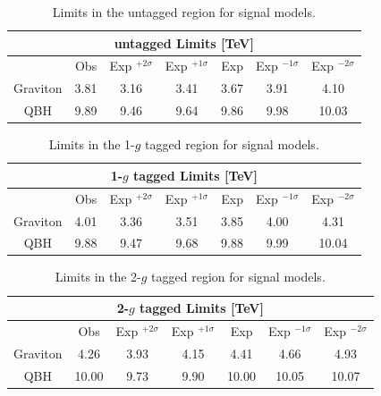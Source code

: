 \begin{table}
	\begin{center} 
		\begin{tabular}{ c c c c c c c }
			\hline
			\multicolumn{7}{c}{ untagged  Limits [TeV]}  \\ \hline
			& Obs & Exp $^{+2\sigma}$&Exp $^{+1\sigma}$ &Exp & Exp $^{-1\sigma}$&Exp $^{-2\sigma}$\\	\hline
			Graviton&3.81 &3.16&3.41  &3.67 &3.91&4.10\\\hline
			QBH&9.89 &9.46&9.64 &9.86 &9.98&10.03\\
			\hline
		\end{tabular}
		\caption{ Limits in the untagged region for signal models.}
		\label{tab:0g}
	\end{center}
\end{table}

\begin{table}
\begin{center} 
\begin{tabular}{ c c c c c c c }
	\hline
	\multicolumn{7}{c}{ 1-$g$ tagged  Limits [TeV]}  \\ \hline
	 & Obs & Exp $^{+2\sigma}$&Exp $^{+1\sigma}$ &Exp & Exp $^{-1\sigma}$&Exp $^{-2\sigma}$\\	\hline
	Graviton&4.01 &3.36&3.51  &3.85 &4.00&4.31\\\hline
QBH&9.88 &9.47&9.68 &9.88 &9.99&10.04\\
	\hline
\end{tabular}
		\caption{ Limits in the 1-$g$ tagged region for signal models.}
\label{tab:1g}
	\end{center}
\end{table}

\begin{table}
\begin{center}
\begin{tabular}{ c c c c c c c }
	\hline
	\multicolumn{7}{c}{ 2-$g$ tagged  Limits [TeV]}  \\ \hline
	& Obs & Exp $^{+2\sigma}$&Exp $^{+1\sigma}$ &Exp & Exp $^{-1\sigma}$&Exp $^{-2\sigma}$\\	\hline
	Graviton&4.26&3.93&4.15 &4.41&4.66&4.93\\\hline
	QBH&10.00 &9.73&9.90 &10.00  &10.05&10.07\\
	\hline
\end{tabular}
	\caption{Limits in the 2-$g$ tagged region for signal models.}
\label{tab:2g}
	\end{center}
\end{table}


